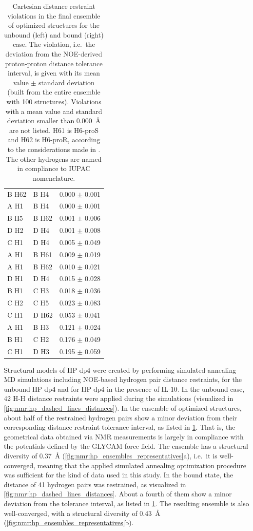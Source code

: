 \begin{table}
\begin{tabular}{llc}
B H62 & B H4 & 0.000 $\pm$ 0.001 \\
A H1 & B H4 & 0.000 $\pm$ 0.001 \\
B H5 & B H62 & 0.001 $\pm$ 0.006 \\
D H2 & D H4 & 0.001 $\pm$ 0.008 \\
C H1 & D H4 & 0.005 $\pm$ 0.049 \\
A H1 & B H61 & 0.009 $\pm$ 0.019 \\
A H1 & B H62 & 0.010 $\pm$ 0.021 \\
D H1 & D H4 & 0.015 $\pm$ 0.028 \\
B H1 & C H3 & 0.018 $\pm$ 0.036 \\
C H2 & C H5 & 0.023 $\pm$ 0.083 \\
C H1 & D H62 & 0.053 $\pm$ 0.041 \\
A H1 & B H3 & 0.121 $\pm$ 0.024 \\
B H1 & C H2 & 0.176 $\pm$ 0.049 \\
C H1 & D H3 & 0.195 $\pm$ 0.059 \\
\midrule
\end{tabular}
\caption{
Cartesian distance restraint violations in the final ensemble of optimized
structures for the unbound (left) and bound (right) case. The violation, i.e.\
the deviation from the NOE-derived proton-proton distance tolerance interval, is
given with its mean value $\pm$ standard deviation (built from the entire
ensemble with 100 structures). Violations with a mean value and standard
deviation smaller than \SI{0.000}{\angstrom} are not listed. H61 is H6-proS and
H62 is H6-proR, according to the considerations made in
\cite{nishida_rotameric_nmr_1988}. The other hydrogens are named in compliance
to IUPAC nomenclature.}
\label{tab:nmr:restraint_viols_free}
\end{table}


Structural models of HP dp4 were created by performing simulated annealing MD
simulations including NOE-based hydrogen pair distance restraints, for the
unbound HP dp4 and for HP dp4 in the presence of IL-10. In the unbound case, 42
H-H distance restraints were applied during the simulations (visualized in
\cref{fig:nmr:hp_dashed_lines_distances}). In the ensemble of optimized
structures, about half of the restrained hydrogen pairs show a minor deviation
from their corresponding distance restraint tolerance interval, as listed in
\cref{tab:nmr:restraint_viols_free}. That is, the geometrical data obtained via
NMR measurements is largely in compliance with the potentials defined by the
GLYCAM force field. The ensemble has a structural diversity of
\SI{0.37}{\angstrom} (\cref{fig:nmr:hp_ensembles_representatives}a), i.e.\ it is
well-converged, meaning that the applied simulated annealing optimization
procedure was sufficient for the kind of data used in this study. In the bound
state, the distance of 41 hydrogen pairs was restrained, as visualized in
\cref{fig:nmr:hp_dashed_lines_distances}. About a fourth of them show a minor
deviation from the tolerance interval, as listed in
\cref{tab:nmr:restraint_viols_free}. The resulting ensemble is also
well-converged, with a structural diversity of \SI{0.43}{\angstrom}
(\cref{fig:nmr:hp_ensembles_representatives}b).

